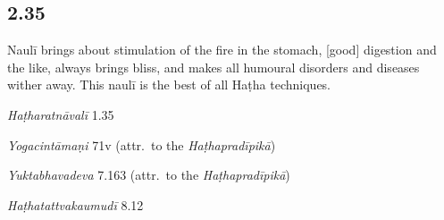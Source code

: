 \begin{ekdosis}
\subsection*{2.35}
\begin{translation}[hp02_035]
Naulī brings about stimulation of the fire in the stomach, [good] digestion and the like, always brings bliss, and makes all humoural disorders and diseases wither away. This naulī is the best of all Haṭha techniques.
\end{translation}


\begin{sources}[hp02_035]
\end{sources}

\begin{testimonia}[hp02_035]
\emph{Haṭharatnāvalī} 1.35

\begin{versinnote}
\end{versinnote}

\emph{Yogacintāmaṇi} 71v (attr.~to the \emph{Haṭhapradīpikā})

\begin{versinnote}
\end{versinnote}

\emph{Yuktabhavadeva} 7.163 (attr.~to the \emph{Haṭhapradīpikā})

\begin{versinnote}
\end{versinnote}

\emph{Haṭhatattvakaumudī} 8.12

\begin{versinnote}
\end{versinnote}



\end{testimonia}
\end{ekdosis}
